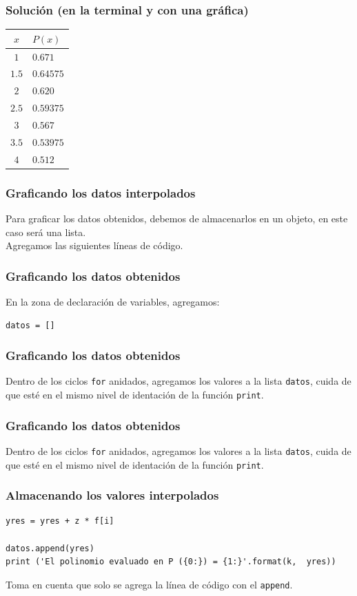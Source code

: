 \documentclass[12pt]{beamer}
\begin{document}
\begin{frame}[fragile]
\frametitle{Solución (en la terminal y con una gráfica)}
\begin{table}
\centering
\renewcommand{\arraystretch}{0.9}
\begin{tabular}{c | l}
$x$ & $P (x)$ \\
\hline $1$   & $0.671$ \\
\hline $1.5$ & $0.64575$ \\
\hline $2$   & $0.620$ \\
\hline $2.5$ & $0.59375$ \\
\hline $3$   & $0.567$ \\
\hline $3.5$ & $0.53975$ \\
\hline $4$   & $0.512$
\end{tabular}
\end{table}
\end{frame}
\begin{frame}
\frametitle{Graficando los datos interpolados}
Para graficar los datos obtenidos, debemos de almacenarlos en un objeto, en este caso será una lista.
\\
\bigskip
\pause
Agregamos las siguientes líneas de código.
\end{frame}
\begin{frame}[fragile]
\frametitle{Graficando los datos obtenidos}
En la zona de declaración de variables, agregamos:
\pause
\begin{verbatim}
datos = []
\end{verbatim}
\end{frame}
\begin{frame}
\frametitle{Graficando los datos obtenidos}
Dentro de los ciclos \texttt{for} anidados, agregamos los valores a la lista \texttt{datos}, cuida de que esté en el mismo nivel de identación de la función \texttt{print}.
\end{frame}
\begin{frame}
\frametitle{Graficando los datos obtenidos}
Dentro de los ciclos \texttt{for} anidados, agregamos los valores a la lista \texttt{datos}, cuida de que esté en el mismo nivel de identación de la función \texttt{print}.
\end{frame}
\begin{frame}[fragile]
\frametitle{Almacenando los valores interpolados}
\begin{lstlisting}[caption=Definiendo el polinomio]
    yres = yres + z * f[i] 

datos.append(yres)
print ('El polinomio evaluado en P ({0:}) = {1:}'.format(k,  yres))
\end{lstlisting}
Toma en cuenta que solo se agrega la línea de código con el \texttt{append}.
\end{frame}
\end{document}
